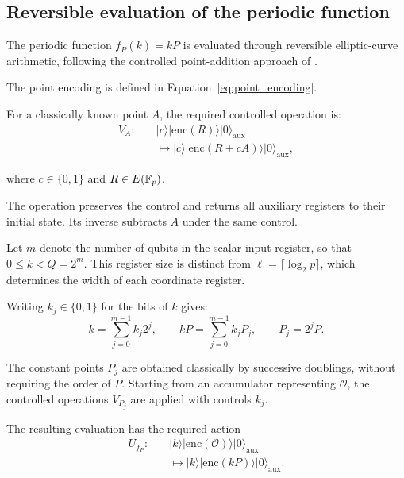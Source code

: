 \begin{revision}
\subsection{Reversible evaluation of the periodic function}

The periodic function $f_P(k)=kP$ is evaluated through reversible elliptic-curve arithmetic, following the controlled point-addition approach of \cite{ProosZalka2003,Roetteler2017}.

The point encoding is defined in Equation~\eqref{eq:point_encoding}.

For a classically known point $A$, the required controlled operation is:
\begin{equation}
    \label{eq:controlled_point_addition}
    \begin{aligned}
        V_A:\quad
        &\lvert c\rangle\lvert\mathrm{enc}(R)\rangle
         \lvert0\rangle_{\mathrm{aux}}\\
        &\longmapsto
         \lvert c\rangle\lvert\mathrm{enc}(R+cA)\rangle
         \lvert0\rangle_{\mathrm{aux}},
    \end{aligned}
\end{equation}

where $c\in\{0,1\}$ and $R\in E(\mathbb{F}_p)$.

The operation preserves the control and returns all auxiliary registers to their initial state. Its inverse subtracts $A$ under the same control.

Let $m$ denote the number of qubits in the scalar input register, so that $0\leq k<Q=2^m$. This register size is distinct from $\ell=\lceil\log_2 p\rceil$, which determines the width of each coordinate register.

Writing $k_j\in\{0,1\}$ for the bits of $k$ gives:
\begin{equation}
    k=\sum_{j=0}^{m-1}k_j2^j,
    \qquad
    kP=\sum_{j=0}^{m-1}k_jP_j,
    \qquad P_j=2^jP.
\end{equation}

The constant points $P_j$ are obtained classically by successive doublings, without requiring the order of $P$. Starting from an accumulator representing $\mathcal{O}$, the controlled operations $V_{P_j}$ are applied with controls $k_j$.

The resulting evaluation has the required action
\begin{equation}
    \label{eq:oracle}
    \begin{aligned}
        U_{f_P}:\quad
        &\lvert k\rangle\lvert\mathrm{enc}(\mathcal{O})\rangle
         \lvert0\rangle_{\mathrm{aux}}\\
        &\longmapsto
         \lvert k\rangle\lvert\mathrm{enc}(kP)\rangle
         \lvert0\rangle_{\mathrm{aux}}.
    \end{aligned}
\end{equation}


\end{revision}
